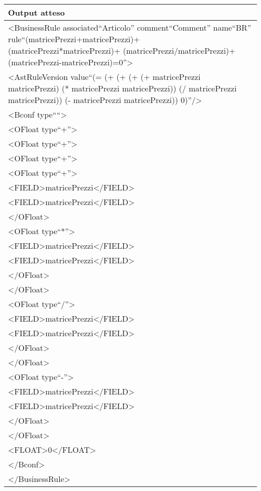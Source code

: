 \begin{center}
\begin{tabular}{|p{11cm}|} \hline
\textbf{Output atteso}\\ \hline
\textless BusinessRule associated``Articolo'' comment``Comment'' name``BR'' rule``(matricePrezzi+matricePrezzi)+ (matricePrezzi*matricePrezzi)+ (matricePrezzi/matricePrezzi)+ (matricePrezzi-matricePrezzi)=0''\textgreater\\
\textless AstRuleVersion value``(= (+ (+ (+ (+ matricePrezzi matricePrezzi) (* matricePrezzi matricePrezzi)) (/ matricePrezzi matricePrezzi)) (- matricePrezzi matricePrezzi)) 0)''/\textgreater\\
\textless Bconf type````\textgreater\\
\textless OFloat type``+''\textgreater\\
\textless OFloat type``+''\textgreater\\
\textless OFloat type``+''\textgreater\\
\textless OFloat type``+''\textgreater\\
\textless FIELD\textgreater matricePrezzi\textless /FIELD\textgreater\\
\textless FIELD\textgreater matricePrezzi\textless /FIELD\textgreater\\
\textless /OFloat\textgreater\\
\textless OFloat type``*''\textgreater\\
\textless FIELD\textgreater matricePrezzi\textless /FIELD\textgreater\\
\textless FIELD\textgreater matricePrezzi\textless /FIELD\textgreater\\
\textless /OFloat\textgreater\\
\textless /OFloat\textgreater\\
\textless OFloat type``/''\textgreater\\
\textless FIELD\textgreater matricePrezzi\textless /FIELD\textgreater\\
\textless FIELD\textgreater matricePrezzi\textless /FIELD\textgreater\\
\textless /OFloat\textgreater\\
\textless /OFloat\textgreater\\
\textless OFloat type``-''\textgreater\\
\textless FIELD\textgreater matricePrezzi\textless /FIELD\textgreater\\
\textless FIELD\textgreater matricePrezzi\textless /FIELD\textgreater\\
\textless /OFloat\textgreater\\
\textless /OFloat\textgreater\\
\textless FLOAT\textgreater0\textless /FLOAT\textgreater\\
\textless /Bconf\textgreater\\
\textless /BusinessRule\textgreater\\
 \hline
\end{tabular} \\
\end{center}

